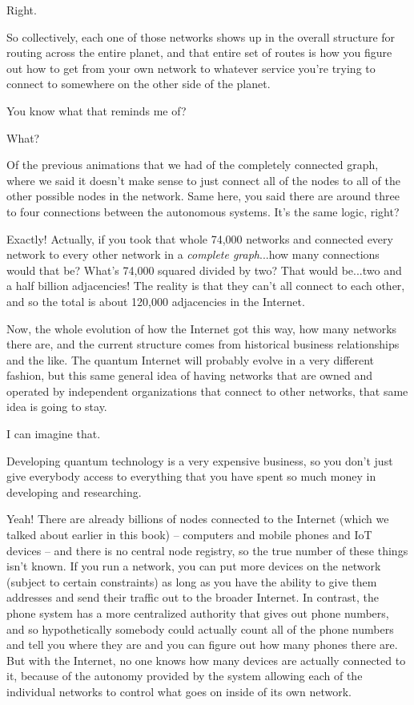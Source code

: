 \mmm Right.

\rrr So collectively, each one of those networks shows up in the overall structure for routing across the entire planet, and that entire set of routes is how you figure out how to get from your own network to whatever service you're trying to connect to somewhere on the other side of the planet.

\mmm You know what that reminds me of? 

\rrr What?

\mmm Of the previous animations that we had of the completely connected graph, where we said it doesn't make sense to just connect all of the nodes to all of the other possible nodes in the network. Same here, you said there are around three to four connections between the autonomous systems. It's the same logic, right?

\rrr Exactly! Actually, if you took that whole 74,000 networks and connected every network to every other network in a \emph{complete graph}...how many connections would that be?  What's 74,000 squared divided by two? That would be...two and a half billion adjacencies!  The reality is that they can't all connect to each other, and so the total is about 120,000 adjacencies in the Internet.

Now, the whole evolution of how the Internet got this way, how many networks there are, and the current structure comes from historical business relationships and the like. The quantum Internet will probably evolve in a very different fashion, but this same general idea of having networks that are owned and operated by independent organizations that connect to other networks, that same idea is going to stay.

\mmm I can imagine that.

Developing quantum technology is a very expensive business, so you don't just give everybody access to everything that you have spent so much money in developing and researching.

\rrr Yeah! There are already billions of nodes connected to the Internet (which we talked about earlier in this book) -- computers and mobile phones and IoT devices -- and there is no central node registry, so the true number of these things isn't known. If you run a network, you can put more devices on the network (subject to certain constraints) as long as you have the ability to give them addresses and send their traffic out to the broader Internet. In contrast, the phone system has a more centralized authority that gives out phone numbers, and so hypothetically somebody could actually count all of the phone numbers and tell you where they are and you can figure out how many phones there are.  But with the Internet, no one knows how many devices are actually connected to it, because of the autonomy provided by the system allowing each of the individual networks to control what goes on inside of its own network.

